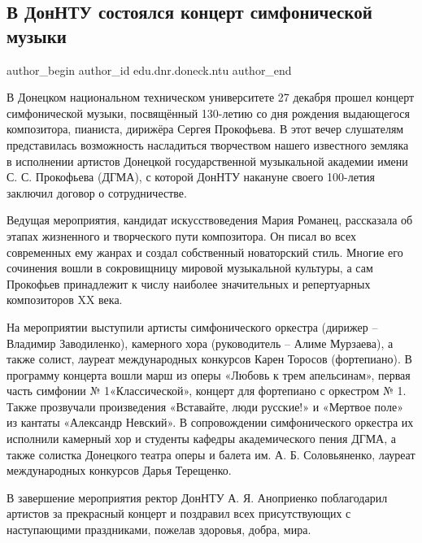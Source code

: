  
 
 
 
 
\subsection{В ДонНТУ состоялся концерт симфонической музыки}
\label{sec:28_12_2021.stz.edu.dnr.doneck.ntu.2.koncert_prokofjev}

\ifcmt
 author_begin
   author_id edu.dnr.doneck.ntu
 author_end
\fi

В Донецком национальном техническом университете 27 декабря прошел концерт
симфонической музыки, посвящённый 130-летию со дня рождения выдающегося
композитора, пианиста, дирижёра Сергея Прокофьева. В этот вечер слушателям
представилась возможность насладиться творчеством нашего известного земляка в
исполнении артистов Донецкой государственной музыкальной академии имени С. С.
Прокофьева (ДГМА), с которой ДонНТУ накануне своего 100-летия заключил договор
о сотрудничестве.


Ведущая мероприятия, кандидат искусствоведения Мария Романец, рассказала об
этапах жизненного и творческого пути композитора. Он писал во всех современных
ему жанрах и создал собственный новаторский стиль. Многие его сочинения вошли в
сокровищницу мировой музыкальной культуры, а сам Прокофьев принадлежит к числу
наиболее значительных и репертуарных композиторов XX века.


На мероприятии выступили артисты симфонического оркестра (дирижер – Владимир
Заводиленко), камерного хора (руководитель – Алиме Мурзаева), а также солист,
лауреат международных конкурсов Карен Торосов (фортепиано). В программу
концерта вошли марш из оперы «Любовь к трем апельсинам», первая часть симфонии
№ 1«Классической», концерт для фортепиано с оркестром № 1. Также прозвучали
произведения «Вставайте, люди русские!» и «Мертвое поле» из кантаты «Александр
Невский». В сопровождении симфонического оркестра их исполнили камерный хор и
студенты кафедры академического пения ДГМА, а также солистка Донецкого театра
оперы и балета им. А. Б. Соловьяненко, лауреат международных конкурсов Дарья
Терещенко.



В завершение мероприятия ректор ДонНТУ А. Я. Аноприенко поблагодарил артистов
за прекрасный концерт и поздравил всех присутствующих с наступающими
праздниками, пожелав здоровья, добра, мира.
